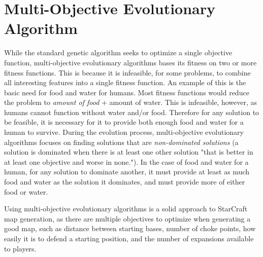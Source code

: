 \section{Multi-Objective Evolutionary Algorithm}
\label{methodology_moea}
While the standard genetic algorithm seeks to optimize a single objective function, multi-objective evolutionary algorithms bases its fitness on two or more fitness functions. This is because it is infeasible, for some problems, to combine all interesting features into a single fitness function. An example of this is the basic need for food and water for humans. Most fitness functions would reduce the problem to \textit{amount of food} + {amount of water}. This is infeasible, however, as humans cannot function without water and/or food. Therefore for any solution to be feasible, it is necessary for it to provide both enough food and water for a human to survive. During the evolution process, multi-objective evolutionary algorithms focuses on finding solutions that are 
\textit{non-dominated solutions} (a solution is dominated when there is at least one other solution "that is better in at least one objective and worse in none."\cite{togelius2013controllable}). In the case of food and water for a human, for any solution to dominate another, it must provide at least as much food and water as the solution it dominates, and must provide more of either food or water.

Using multi-objective evolutionary algorithms is a solid approach to StarCraft map generation, as there are multiple objectives to optimize when generating a good map, such as distance between starting bases, number of choke points, how easily it is to defend a starting position, and the number of expansions available to players.